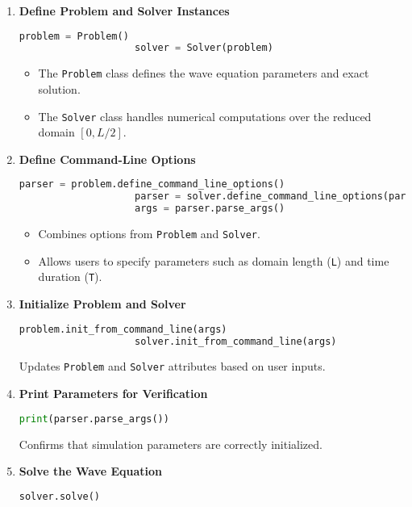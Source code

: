\documentclass{article}
\begin{document}
			\begin{enumerate}
				\item \textbf{Define Problem and Solver Instances}
				\begin{lstlisting}[language=Python]
					problem = Problem()
					solver = Solver(problem)
				\end{lstlisting}
				
				\begin{itemize}
					\item The \texttt{Problem} class defines the wave equation parameters and exact solution.
					\item The \texttt{Solver} class handles numerical computations over the reduced domain \([0, L/2]\).
				\end{itemize}
				
				\item \textbf{Define Command-Line Options}
				\begin{lstlisting}[language=Python]
					parser = problem.define_command_line_options()
					parser = solver.define_command_line_options(parser)
					args = parser.parse_args()
				\end{lstlisting}
				
				\begin{itemize}
					\item Combines options from \texttt{Problem} and \texttt{Solver}.
					\item Allows users to specify parameters such as domain length (\texttt{L}) and time duration (\texttt{T}).
				\end{itemize}
				
				\item \textbf{Initialize Problem and Solver}
				\begin{lstlisting}[language=Python]
					problem.init_from_command_line(args)
					solver.init_from_command_line(args)
				\end{lstlisting}
				 Updates \texttt{Problem} and \texttt{Solver} attributes based on user inputs.
				
				\item \textbf{Print Parameters for Verification}
				\begin{lstlisting}[language=Python]
					print(parser.parse_args())
				\end{lstlisting}
				 Confirms that simulation parameters are correctly initialized.
				
				\item \textbf{Solve the Wave Equation}
				\begin{lstlisting}[language=Python]
					solver.solve()
				\end{lstlisting}
				

\end{enumerate}
\end{document}
